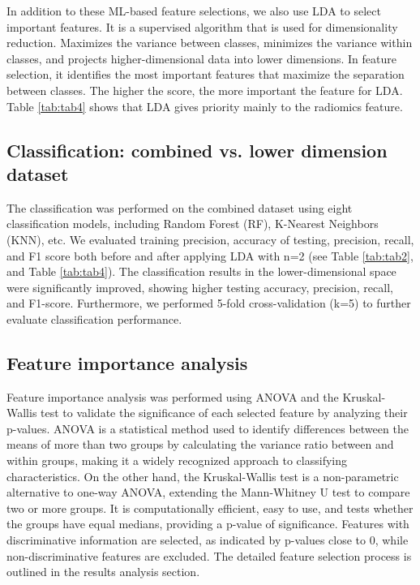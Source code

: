 \documentclass{article}
\begin{document}
In addition to these ML-based feature selections, we also use LDA to select important features. It is a supervised algorithm that is used for dimensionality reduction. Maximizes the variance between classes, minimizes the variance within classes, and projects higher-dimensional data into lower dimensions. In feature selection, it identifies the most important features that maximize the separation between classes. The higher the score, the more important the feature for LDA. Table \ref{tab:tab4} shows that LDA gives priority mainly to the radiomics feature.

\subsection{Classification: combined vs. lower dimension dataset}
The classification was performed on the combined dataset using eight classification models, including Random Forest (RF), K-Nearest Neighbors (KNN), etc. We evaluated training precision, accuracy of testing, precision, recall, and F1 score both before and after applying LDA with n=2 (see Table \ref{tab:tab2}, and Table \ref{tab:tab4}). The classification results in the lower-dimensional space were significantly improved, showing higher testing accuracy, precision, recall, and F1-score. Furthermore, we performed 5-fold cross-validation (k=5) to further evaluate classification performance.


\subsection{Feature importance analysis}

Feature importance analysis was performed using ANOVA and the Kruskal-Wallis test to validate the significance of each selected feature by analyzing their p-values. ANOVA is a statistical method used to identify differences between the means of more than two groups by calculating the variance ratio between and within groups, making it a widely recognized approach to classifying characteristics. On the other hand, the Kruskal-Wallis test \cite{ali2014kruskal} is a non-parametric alternative to one-way ANOVA, extending the Mann-Whitney U test to compare two or more groups. It is computationally efficient, easy to use, and tests whether the groups have equal medians, providing a p-value of significance. Features with discriminative information are selected, as indicated by p-values close to 0, while non-discriminative features are excluded. The detailed feature selection process is outlined in the results analysis section.
\end{document}
